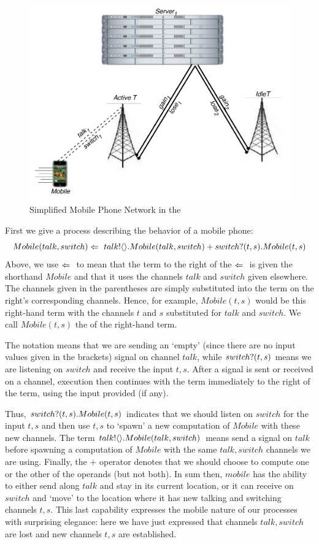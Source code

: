 	\begin{figure}[H]
	\centering
	\includegraphics[scale=0.7]{figures/cell_network_pi.pdf} %
	\caption{Simplified Mobile Phone Network in the \picalc}
	\label{fig_cell_network_pi}
	\end{figure}
	
	First we give a process describing the behavior of a mobile phone:
	\[
		Mobile(talk, switch) \Leftarrow\  {talk}!\langle{}\rangle. Mobile(talk,switch) + {switch}?({t,s}). Mobile(t,s)
	\]
	Above, we use $\Leftarrow\ $ to mean that the term to the right of the $\Leftarrow\ $ is given the shorthand $Mobile$ and that it uses the channels $talk$ and $switch$ given elsewhere.  The channels given in the parentheses are simply substituted into the term on the right's corresponding channels.  Hence, for example, $Mobile(t,s)$ would be this right-hand term with the channels $t$ and $s$ substituted for $talk$ and $switch$. We call $Mobile(t,s)$ the  of the right-hand term.
	
	The notation  means that we are sending an `empty' (since there are no input values given in the brackets) signal on channel $talk$, while ${switch}?({t,s})$ means we are listening on $switch$ and receive the input $t,s$.  After a signal is sent or received on a channel, execution then continues with the term immediately to the right of the term, using the input provided (if any).  
	
	Thus, ${switch}?({t,s}). Mobile(t,s)$ indicates that we should listen on $switch$ for the input $t,s$ and then use $t,s$ to `spawn' a new computation of $Mobile$ with these new channels. The term ${talk}!\langle{}\rangle. Mobile(talk,switch)$ means send a signal on $talk$ before spawning a computation of $Mobile$ with the same $talk,switch$ channels we are using.  Finally, the $+$ operator denotes that we should choose to compute one or the other of the operands (but not both).  In sum then, $mobile$ has the ability to either send along $talk$ and stay in its current location, or it can receive on $switch$ and `move' to the location where it has new talking and switching channels $t,s$.  This last capability expresses the mobile nature of our processes with surprising elegance: here we have just expressed that channels $talk,switch$ are lost and new channels $t,s$ are established.
	
